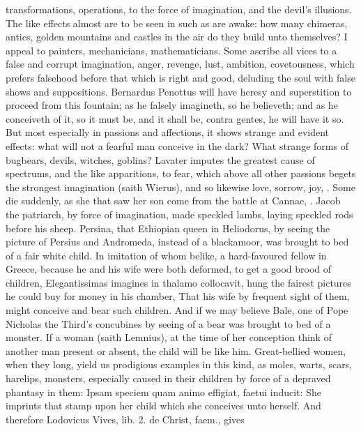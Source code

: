 {transformations, operations, \etc{} to the force of  imagination,
and the devil's illusions. The like effects almost are to be seen
in such as are awake: how many chimeras, antics, golden mountains and
castles in the air do they build unto themselves? I appeal to painters,
mechanicians, mathematicians. Some ascribe all vices to a false and
corrupt imagination, anger, revenge, lust, ambition, covetousness,
which prefers falsehood before that which is right and good, deluding
the soul with false shows and suppositions. Bernardus Penottus
will have heresy and superstition to proceed from this fountain; as he
falsely imagineth, so he believeth; and as he conceiveth of it, so it
must be, and it shall be, contra gentes, he will have it so. But most
especially in passions and affections, it shows strange and evident
effects: what will not a fearful man conceive in the dark? What strange
forms of bugbears, devils, witches, goblins? Lavater imputes the
greatest cause of spectrums, and the like apparitions, to fear, which
above all other passions begets the strongest imagination (saith
Wierus), and so likewise love, sorrow, joy, \etc{}. Some die
suddenly, as she that saw her son come from the battle at Cannae, \etc{}.
Jacob the patriarch, by force of imagination, made speckled lambs,
laying speckled rods before his sheep. Persina, that Ethiopian queen in
Heliodorus, by seeing the picture of Persius and Andromeda, instead of
a blackamoor, was brought to bed of a fair white child. In imitation of
whom belike, a hard-favoured fellow in Greece, because he and his wife
were both deformed, to get a good brood of children, Elegantissimas
imagines in thalamo collocavit, \etc{} hung the fairest pictures he could
buy for money in his chamber, That his wife by frequent sight of them,
might conceive and bear such children. And if we may believe Bale, one
of Pope Nicholas the Third's concubines by seeing of a bear was
brought to bed of a monster. If a woman (saith  Lemnius), at the
time of her conception think of another man present or absent, the
child will be like him. Great-bellied women, when they long, yield us
prodigious examples in this kind, as moles, warts, scars, harelips,
monsters, especially caused in their children by force of a depraved
phantasy in them: Ipsam speciem quam animo effigiat, faetui inducit:
She imprints that stamp upon her child which she conceives unto
herself. And therefore Lodovicus Vives, lib. 2. de Christ, faem., gives
}
